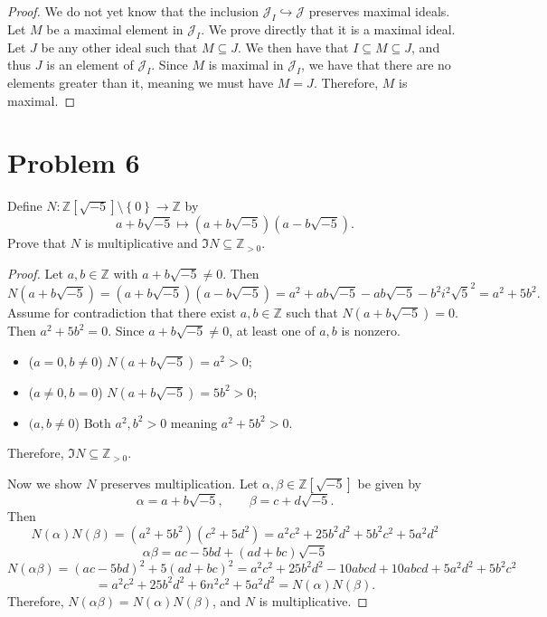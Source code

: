 \documentclass[11pt, letterpaper]{article}
\begin{document}
\begin{proof}
	We do not yet know that the inclusion $\mathcal{J} _I\hookrightarrow \mathcal{J} $ preserves maximal ideals. Let $M$ be a maximal element in $\mathcal{J} _I$. We prove directly that it is a maximal ideal. Let $J$ be any other ideal such that $M\subseteq J$. We then have that $I\subseteq M\subseteq J$, and thus $J$ is an element of $\mathcal{J} _I$. Since $M$ is maximal in $\mathcal{J} _I$, we have that there are no elements greater than it, meaning we must have $M=J$. Therefore, $M$ is maximal.
\end{proof}

\section{Problem 6}

\begin{problem}
	Define $N : \mathbb{Z} [\sqrt{-5} ]\setminus \left\{ 0 \right\}  \to \mathbb{Z} $ by
	\[
		a+b\sqrt{-5} \mapsto \left( a+b \sqrt{-5}  \right) \left( a-b \sqrt{-5}  \right) 
	.\]
	Prove that $N$ is multiplicative and $\Im N \subseteq \mathbb{Z} _{>0} $.
\end{problem}
\begin{proof}
	Let $a,b\in\mathbb{Z} $ with $a+b\sqrt{-5} \neq 0$. Then
	\[
		N\left( a+b\sqrt{-5}  \right) =\left( a+b \sqrt{-5}  \right) \left( a-b \sqrt{-5}  \right) =a^2+ab \sqrt{-5} -ab \sqrt{-5} -b^2i^2 \sqrt{5} ^2=a^2 + 5b^2
	.\]
	Assume for contradiction that there exist $a,b\in\mathbb{Z} $ such that $N(a+b\sqrt{-5} )=0$. Then $a^2+5b^2=0$. Since $a+b\sqrt{-5} \neq 0$, at least one of $a,b$ is nonzero.
	\begin{itemize}
		\item ($a=0,b\neq 0$) $N(a+b\sqrt{-5} )=a^2>0$;
		\item ($a\neq 0,b=0$) $N(a+b\sqrt{-5} )=5b^2>0$;
		\item $(a,b \neq 0$) Both $a^2,b^2 > 0$ meaning $a^2 +5b^2 > 0$.
	\end{itemize}
	Therefore, $\Im N \subseteq \mathbb{Z} _{>0} $.

	Now we show $N$ preserves multiplication. Let $\alpha ,\beta \in\mathbb{Z} [\sqrt{-5} ]$ be given by
	\[
		\alpha =a+b\sqrt{-5} ,\qquad \beta =c+d\sqrt{-5} 
	.\]
	Then
	\[
		N(\alpha )N(\beta )=\left( a^2+5b^2 \right) \left( c^2+5d^2 \right) =a^2c^2+25b^2d^2+5b^2c^2+5a^2d^2
	\]
	\[
		\alpha \beta =ac-5bd+\left( ad+bc \right) \sqrt{-5} 
	\]
	\[
		N(\alpha \beta )=(ac-5bd)^2+5(ad+bc)^2=a^2c^2+25b^2d^2-10abcd+10abcd+5a^2d^2+5b^2c^2
	\]
	\[
		=a^2c^2+25b^2d^2+6n^2c^2+5a^2d^2=N(\alpha )N(\beta )
	.\]
	Therefore, $N(\alpha \beta )=N(\alpha )N(\beta )$, and $N$ is multiplicative.
\end{proof}
\end{document}
